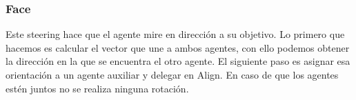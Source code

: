 \subsubsection{Face}

Este steering hace que el agente mire en dirección a su objetivo. Lo primero que hacemos es calcular el vector que une a ambos agentes, con ello podemos obtener la dirección en la que se encuentra el otro agente. El siguiente paso es asignar esa orientación a un agente auxiliar y delegar en Align. En caso de que los agentes estén juntos no se realiza ninguna rotación.



